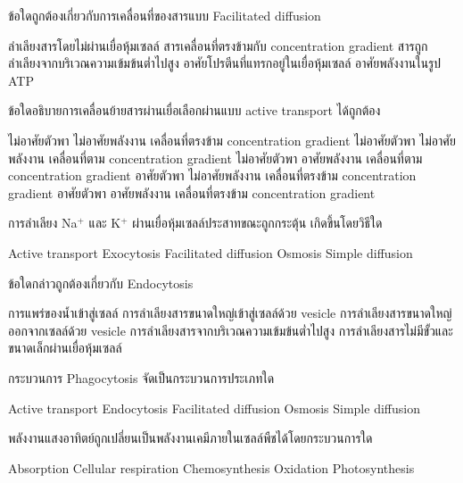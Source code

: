 \begin{questions}
\filbreak
  \question ข้อใดถูกต้องเกี่ยวกับการเคลื่อนที่ของสารแบบ Facilitated diffusion
  \begin{choices}
    \choice ลำเลียงสารโดยไม่ผ่านเยื่อหุ้มเซลล์
    \choice สารเคลื่อนที่ตรงข้ามกับ concentration gradient
    \choice สารถูกลำเลียงจากบริเวณความเข้มข้นต่ำไปสูง
    \choice อาศัยโปรตีนที่แทรกอยู่ในเยื่อหุ้มเซลล์
    \choice อาศัยพลังงานในรูป ATP
\end{choices}

\filbreak
  \question ข้อใดอธิบายการเคลื่อนย้ายสารผ่านเยื่อเลือกผ่านแบบ active transport ได้ถูกต้อง
  \begin{choices}
    \choice ไม่อาศัยตัวพา ไม่อาศัยพลังงาน เคลื่อนที่ตรงข้าม concentration gradient
    \choice ไม่อาศัยตัวพา ไม่อาศัยพลังงาน เคลื่อนที่ตาม concentration gradient
    \choice ไม่อาศัยตัวพา อาศัยพลังงาน เคลื่อนที่ตาม concentration gradient
    \choice อาศัยตัวพา ไม่อาศัยพลังงาน เคลื่อนที่ตรงข้าม concentration gradient
    \choice อาศัยตัวพา อาศัยพลังงาน เคลื่อนที่ตรงข้าม concentration gradient
\end{choices}

\filbreak
  \question การลำเลียง Na$^+$ และ K$^+$ ผ่านเยื่อหุ้มเซลล์ประสาทขณะถูกกระตุ้น เกิดขึ้นโดยวิธีใด
  \begin{choices}
    \choice Active transport
    \choice Exocytosis
    \choice Facilitated diffusion
    \choice Osmosis
    \choice Simple diffusion
\end{choices}

\filbreak
  \question ข้อใดกล่าวถูกต้องเกี่ยวกับ Endocytosis
  \begin{choices}
    \choice การแพร่ของน้ำเข้าสู่เซลล์
    \choice การลำเลียงสารขนาดใหญ่เข้าสู่เซลล์ด้วย vesicle
    \choice การลำเลียงสารขนาดใหญ่ออกจากเซลล์ด้วย vesicle
    \choice การลำเลียงสารจากบริเวณความเข้มข้นต่ำไปสูง
    \choice การลำเลียงสารไม่มีขั้วและขนาดเล็กผ่านเยื่อหุ้มเซลล์
\end{choices}

\filbreak
  \question กระบวนการ Phagocytosis จัดเป็นกระบวนการประเภทใด
  \begin{choices}
    \choice Active transport
    \choice Endocytosis
    \choice Facilitated diffusion
    \choice Osmosis
    \choice Simple diffusion
\end{choices}

\filbreak
  \question พลังงานแสงอาทิตย์ถูกเปลี่ยนเป็นพลังงานเคมีภายในเซลล์พืชได้โดยกระบวนการใด
  \begin{choices}
    \choice Absorption
    \choice Cellular respiration
    \choice Chemosynthesis
    \choice Oxidation
    \choice Photosynthesis
\end{choices}


\end{questions}
